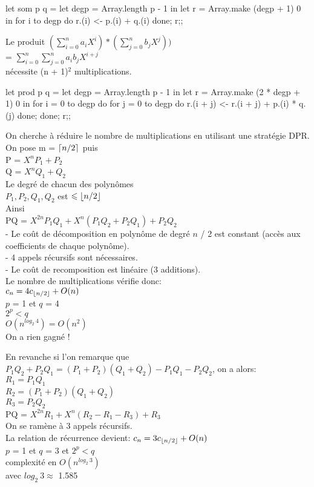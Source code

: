 \documentclass{article}
\DeclarePairedDelimiter\ceil{\lceil}{\rceil}
\DeclarePairedDelimiter\floor{\lfloor}{\rfloor}
\begin{document}
				\begin{case}
let som p q =
	let degp = Array.length p - 1 in
		let r = Array.make (degp + 1) 0 in
			for i to degp do
				r.(i) <- p.(i) + q.(i)
			done; r;;
				\end{case}
				
				Le produit $(\sum_{i = 0}^{n} a_i X^i) * (\sum_{j = 0}^{n} b_j X^j))$\\
				= $\sum_{i = 0}^{n} \sum_{j = 0}^{n} a_i b_j X^{i + j}$\\
				nécessite (n + 1)$^2$ multiplications.
				
				\begin{case}
let prod p q =
	let degp = Array.length p - 1 in
		let r = Array.make (2 * degp + 1) 0 in
			for i = 0 to degp do
				for j = 0 to degp do
					r.(i + j) <- r.(i + j) + p.(i) * q.(j)
				done; done; r;;
				\end{case}
				
			On cherche à réduire le nombre de multiplications en utilisant une stratégie DPR.\\
			On pose m = $\ceil{n / 2}$ puis\\
			P = $X^n P_1 + P_2$\\
			Q = $X^n Q_1 + Q_2$\\
			Le degré de chacun des polynômes\\
			$P_1, P_2, Q_1, Q_2$ est $\leqslant \floor{n / 2}$\\
			Ainsi\\
			PQ = $X^{2n}P_1 Q_1 + X^n(P_1 Q_2 + P_2 Q_1) + P_2 Q_2$\\
			- Le coût de décomposition en polynôme de degré $n$ / 2 est constant (accès aux coefficients de chaque polynôme).\\
			- 4 appels récursifs sont nécessaires.\\
			- Le coût de recomposition est linéaire (3 additions).\\
			Le nombre de multiplications vérifie donc:\\
			$c_n = 4c_{\floor{n / 2}} + O(n)$\\
			$p$ = 1 et $q$ = 4\\
			$2^p < q$\\
			$O(n^{log_2\ 4}) = O(n^2)$\\
			On a rien gagné !
			
			En revanche si l'on remarque que\\
			$P_1 Q_2 + P_2 Q_1 = (P_1 + P_2)(Q_1 + Q_2) - P_1 Q_1 - P_2 Q_2$, on  a alors:\\
			$R_1 = P_1 Q_1$\\
			$R_2 = (P_1 + P_2)(Q_1 + Q_2)$\\
			$R_3 = P_2 Q_2$\\
			PQ = $X^{2n}R_1 + X^n(R_2 - R_1 - R_3) + R_3$\\
			On se ramène à 3 appels récursifs.\\
			La relation de récurrence devient: $c_n = 3c_{\floor{n / 2}} + O(n)$\\
			$p$ = 1 et $q$ = 3 et $2^p < q$\\
			complexité en $O(n^{log_2\ 3})$\\
			avec $log_2\ 3 \approx$ 1.585
			
\end{document}
